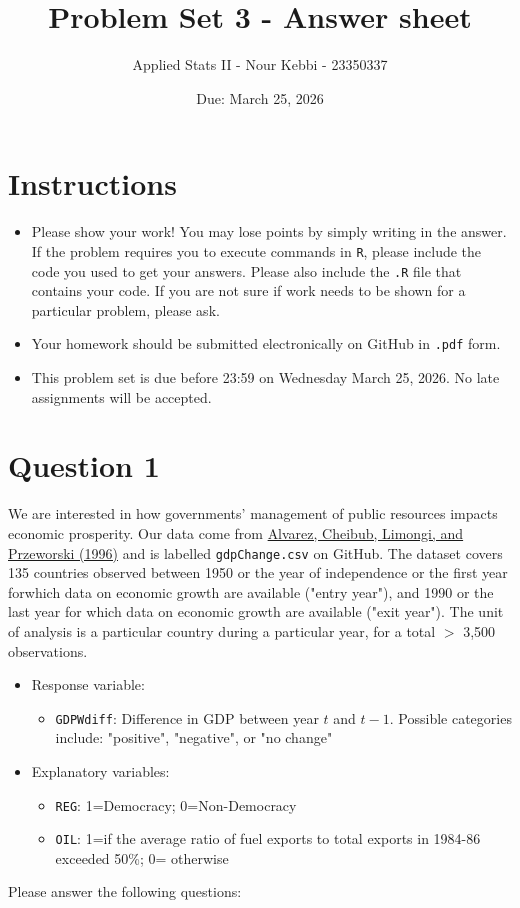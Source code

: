 \documentclass[12pt,letterpaper]{article}
\title{Problem Set 3 - Answer sheet}
\date{Due: March 25, 2026}
\author{Applied Stats II - Nour Kebbi - 23350337}
\begin{document}
	\maketitle
	\section*{Instructions}
	\begin{itemize}
	\item Please show your work! You may lose points by simply writing in the answer. If the problem requires you to execute commands in \texttt{R}, please include the code you used to get your answers. Please also include the \texttt{.R} file that contains your code. If you are not sure if work needs to be shown for a particular problem, please ask.
\item Your homework should be submitted electronically on GitHub in \texttt{.pdf} form.
\item This problem set is due before 23:59 on Wednesday March 25, 2026. No late assignments will be accepted.
	\end{itemize}

	\vspace{.25cm}
\section*{Question 1}
\vspace{.25cm}
\noindent We are interested in how governments' management of public resources impacts economic prosperity. Our data come from \href{https://www.researchgate.net/profile/Adam_Przeworski/publication/240357392_Classifying_Political_Regimes/links/0deec532194849aefa000000/Classifying-Political-Regimes.pdf}{Alvarez, Cheibub, Limongi, and Przeworski (1996)} and is labelled \texttt{gdpChange.csv} on GitHub. The dataset covers 135 countries observed between 1950 or the year of independence or the first year forwhich data on economic growth are available ("entry year"), and 1990 or the last year for which data on economic growth are available ("exit year"). The unit of analysis is a particular country during a particular year, for a total $>$ 3,500 observations. 

\begin{itemize}
	\item
	Response variable: 
	\begin{itemize}
		\item \texttt{GDPWdiff}: Difference in GDP between year $t$ and $t-1$. Possible categories include: "positive", "negative", or "no change"
	\end{itemize}
	\item
	Explanatory variables: 
	\begin{itemize}
		\item
		\texttt{REG}: 1=Democracy; 0=Non-Democracy
		\item
		\texttt{OIL}: 1=if the average ratio of fuel exports to total exports in 1984-86 exceeded 50\%; 0= otherwise
	\end{itemize}
	
\end{itemize}
\newpage
\noindent Please answer the following questions:
\end{document}
